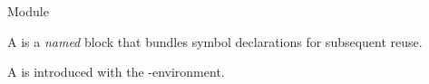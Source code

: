 \documentclass{stex}
\begin{document}
  \begin{smodule}[title=\sTeX-Modules]{Module}

    \begin{sparagraph}[style={defibox,symdoc},name=module]
        A  is a \emph{named} 
        block that bundles symbol declarations for subsequent reuse.

        A  is introduced with the
        -environment.
    \end{sparagraph}
    
  \end{smodule}
\end{document}
